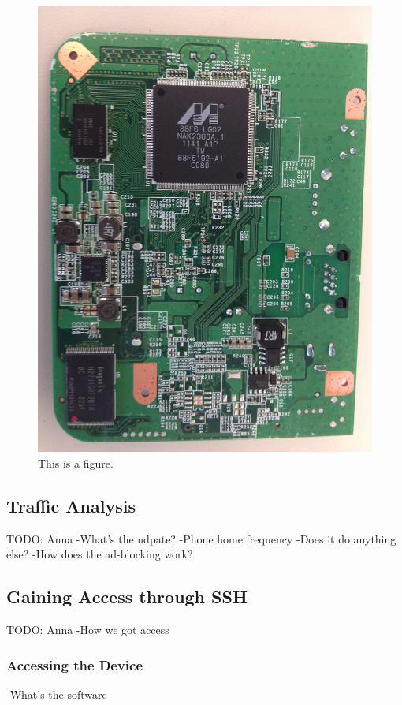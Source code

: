 \begin{figure}[htb]
\begin{center}
\includegraphics[width=\linewidth]{safeplug_bottom}
\caption{This is a figure.}
\end{center}
\end{figure}

\subsection{Traffic Analysis}
TODO: Anna
    -What's the udpate?
    -Phone home frequency
    -Does it do anything else?
    -How does the ad-blocking work?

\subsection{Gaining Access through SSH}
TODO: Anna
    -How we got access
    \subsubsection{Accessing the Device}
    -What's the software
